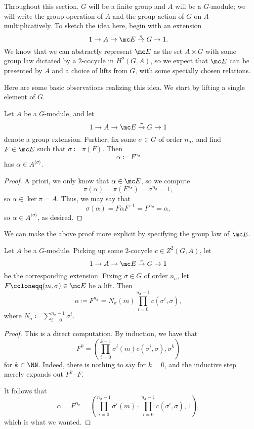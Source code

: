 
Throughout this section, $ G$ will be a finite group and $A$ will be a $ G$-module; we will write the group operation of $A$ and the group action of $ G$ on $A$ multiplicatively. To sketch the idea here, begin with an extension
\[1\to A\to\mc E\stackrel\pi\to G\to1.\]
We know that we can abstractly represent $\mc E$ as the set $A\times G$ with some group law dictated by a $2$-cocycle in $H^2(G,A)$, so we expect that $\mc E$ can be presented by $A$ and a choice of lifts from $ G$, with some specially chosen relations.

Here are some basic observations realizing this idea. We start by lifting a single element of $ G$.
\begin{lemma} \label{lem:constructalpha}
	Let $A$ be a $ G$-module, and let 
	\[1\to A\to\mc E\stackrel\pi\to G\to1\]
	denote a group extension. Further, fix some $\sigma\in G$ of order $n_\sigma$, and find $F\in\mc E$ such that $\sigma\coloneqq\pi(F)$. Then
	\[\alpha\coloneqq F^{n_\sigma}\]
	has $\alpha\in A^{\langle\sigma\rangle}$.
\end{lemma}
\begin{proof}
	A priori, we only know that $\alpha\in\mc E$, so we compute
	\[\pi(\alpha)=\pi\left(F^{n_\sigma}\right)=\sigma^{n_\sigma}=1,\]
	so $\alpha\in\ker\pi=A$. Thus, we may say that
	\[\sigma(\alpha)=F\alpha F^{-1}=F^{n_\sigma}=\alpha,\]
	so $\alpha\in A^{\langle\sigma\rangle}$, as desired.
\end{proof}
We can make the above proof more explicit by specifying the group law of $\mc E$.
\begin{lemma} \label{lem:explicitalpha}
	Let $A$ be a $ G$-module. Picking up some $2$-cocycle $c\in Z^2( G,A)$, let
	\[1\to A\to\mc E\stackrel\pi\to G\to1\]
	be the corresponding extension. Fixing $\sigma\in G$ of order $n_\sigma$, let $F\coloneqq(m,\sigma)\in\mc E$ be a lift. Then
	\[\alpha\coloneqq F^{n_\sigma}=N_\sigma(m)\prod_{i=0}^{n_\sigma-1}c\left(\sigma^i,\sigma\right),\]
	where $N_\sigma\coloneqq\sum_{i=0}^{n_\sigma-1}\sigma^i$.
\end{lemma}
\begin{proof}
	This is a direct computation. By induction, we have that
	\[F^k=\left(\prod_{i=0}^{k-1}\sigma^i(m)c\left(\sigma^i,\sigma\right),\sigma^k\right)\]
	for $k\in\NN$. Indeed, there is nothing to say for $k=0$, and the inductive step merely expands out $F^k\cdot F$.

	It follows that
	\[\alpha=F^{n_\sigma}=\left(\prod_{i=0}^{n_\sigma-1}\sigma^i(m)\cdot\prod_{i=0}^{n_\sigma-1}c\left(\sigma^i,\sigma\right),1\right),\]
	which is what we wanted.
\end{proof}
